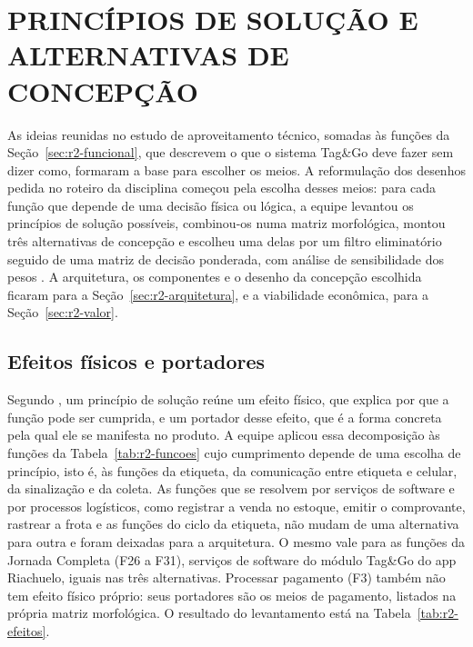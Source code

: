 
\section{PRINCÍPIOS DE SOLUÇÃO E ALTERNATIVAS DE CONCEPÇÃO}
\label{sec:r2-concepcao}

As ideias reunidas no estudo de aproveitamento técnico, somadas às funções da Seção~\ref{sec:r2-funcional}, que descrevem o que o sistema Tag\&Go deve fazer sem dizer como, formaram a base para escolher os meios. A reformulação dos desenhos pedida no roteiro da disciplina começou pela escolha desses meios: para cada função que depende de uma decisão física ou lógica, a equipe levantou os princípios de solução possíveis, combinou-os numa matriz morfológica, montou três alternativas de concepção e escolheu uma delas por um filtro eliminatório seguido de uma matriz de decisão ponderada, com análise de sensibilidade dos pesos \cite{zancul2026conceitual}. A arquitetura, os componentes e o desenho da concepção escolhida ficaram para a Seção~\ref{sec:r2-arquitetura}, e a viabilidade econômica, para a Seção~\ref{sec:r2-valor}.

\subsection{Efeitos físicos e portadores}

Segundo , um princípio de solução reúne um efeito físico, que explica por que a função pode ser cumprida, e um portador desse efeito, que é a forma concreta pela qual ele se manifesta no produto. A equipe aplicou essa decomposição às funções da Tabela~\ref{tab:r2-funcoes} cujo cumprimento depende de uma escolha de princípio, isto é, às funções da etiqueta, da comunicação entre etiqueta e celular, da sinalização e da coleta. As funções que se resolvem por serviços de software e por processos logísticos, como registrar a venda no estoque, emitir o comprovante, rastrear a frota e as funções do ciclo da etiqueta, não mudam de uma alternativa para outra e foram deixadas para a arquitetura. O mesmo vale para as funções da Jornada Completa (F26 a F31), serviços de software do módulo Tag\&Go do app Riachuelo, iguais nas três alternativas. Processar pagamento (F3) também não tem efeito físico próprio: seus portadores são os meios de pagamento, listados na própria matriz morfológica. O resultado do levantamento está na Tabela~\ref{tab:r2-efeitos}.

